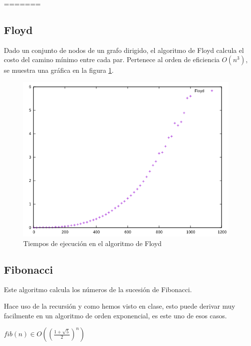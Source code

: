 \documentclass{article}
\begin{document}
=======
\subsection{Floyd}
Dado un conjunto de nodos de un grafo dirigido, el algoritmo de Floyd calcula el costo del camino mínimo entre cada par. Pertenece al orden de eficiencia $O(n ^3)$, se muestra una gráfica en la figura \ref{fig:floyd}.
\begin{figure}[H]
	\centering
	\includegraphics[totalheight=8cm]{img/floyd}
	\caption{Tiempos de ejecución en el algoritmo de Floyd}
	\label{fig:floyd}
\end{figure}
\subsection{Fibonacci}
Este algoritmo calcula los números de la sucesión de Fibonacci. 
\

Hace uso de la recursión y como hemos visto en clase, esto puede derivar muy facilmente en un algoritmo de orden exponencial, es este uno de esos casos.
\

$fib(n) \in O((\frac{1+\sqrt5}{2})^n)$

\end{document}
